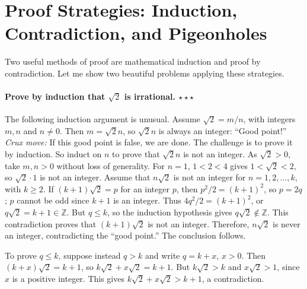 \documentclass[11pt,a4paper]{article}
\begin{document}
\section*{Proof Strategies: Induction, Contradiction, and Pigeonholes}
\setcounter{theorem}{43}\begin{lemma}
Two useful methods of proof are mathematical induction and proof by contradiction.
Let me show two beautiful problems applying these strategies.
\end{lemma}
\paragraph{Prove by induction that $\sqrt2$ is irrational. \texorpdfstring{$\star\star\star$}{***}}
The following induction argument is unusual.
Assume $\sqrt2=m/n$, with integers $m,n$ and $n\ne0$.
Then $m=\sqrt2n$, so $\sqrt2n$ is always an integer: ``Good point!''
\emph{Crux move:} If this good point is false, we are done. The challenge is
to prove it by induction.
So induct on $n$ to prove that $\sqrt2n$ is not an integer.
As $\sqrt2>0$, take $m,n>0$ without loss of generality.
For $n=1$, $1<2<4$ gives $1<\sqrt2<2$, so $\sqrt2\cdot1$ is not an integer.
Assume that $n\sqrt2$ is not an integer for $n=1,2,\ldots,k$, with $k\geq2$.
If $(k+1)\sqrt2=p$ for an integer $p$, then $p^2/2=(k+1)^2$, so $p=2q$;
$p$ cannot be odd since $k+1$ is an integer.
Thus $4q^2/2=(k+1)^2$, or $q\sqrt2=k+1\in\mathbb Z$.
But $q\leq k$, so the induction hypothesis gives $q\sqrt2\notin\mathbb Z$.
This contradiction proves that $(k+1)\sqrt2$ is not an integer.
Therefore, $n\sqrt2$ is never an integer, contradicting the ``good point.'' The conclusion follows.
\begin{remark}
To prove $q\leq k$, suppose instead $q>k$ and write $q=k+x$, $x>0$.
Then $(k+x)\sqrt2=k+1$, so $k\sqrt2+x\sqrt2=k+1$.
But $k\sqrt2>k$ and $x\sqrt2>1$, since $x$ is a positive integer.
This gives $k\sqrt2+x\sqrt2>k+1$, a contradiction.
\end{remark}

\end{document}
